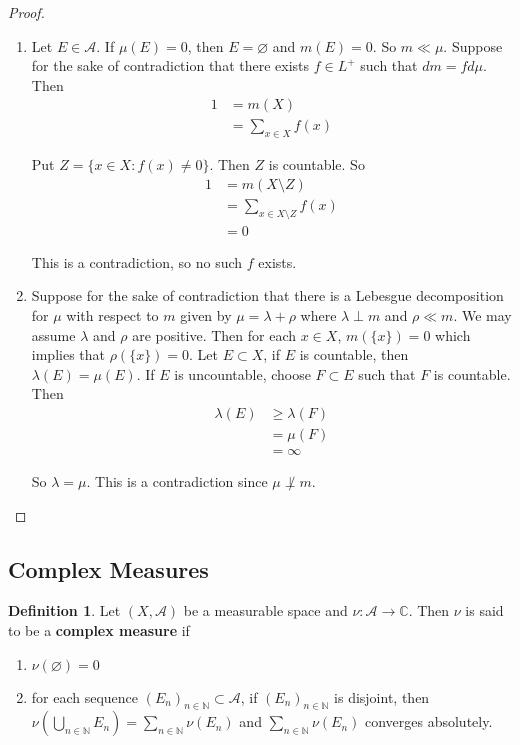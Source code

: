 \documentclass[12pt]{amsart}
\theoremstyle{definition}
\newtheorem{defn}[definition]{Definition}
\newcommand{\lam}{\lambda}
\newcommand{\C}{\mathbb{C}}
\newcommand{\N}{\mathbb{N}}
\newcommand{\MA}{\mathcal{A}}
\newcommand{\ld}[1]{\label{defn:#1}}
\begin{document}
	\begin{proof}
		\begin{enumerate}
			\item Let $E \in \MA$. If $\mu(E) = 0$, then $E = \varnothing$ and $m(E) = 0$. So $m \ll \mu$. Suppose for the sake of contradiction that there exists $f \in L^+$ such that $dm = f d\mu$. Then 
			\begin{align*}
				1
				&= m(X) \\
				&= \sum_{x \in X} f(x)
			\end{align*}
			
			Put $Z = \{x \in X: f(x) \neq 0 \}$. Then $Z$ is countable. So 
			\begin{align*}
				1
				&= m(X \setminus Z) \\
				&= \sum_{x \in X \setminus Z} f(x)\\
				&= 0
			\end{align*}
			
			This is a contradiction, so no such $f$ exists.
			
			\item Suppose for the sake of contradiction that there is a Lebesgue decomposition for $\mu$ with respect to $m$ given by $\mu = \lam + \rho$ where $\lam \perp m$ and $\rho \ll m$. We may assume $\lam$ and $\rho$ are positive. Then for each $x \in X$, $m(\{x\})=0$ which implies that $\rho(\{x\}) = 0$. Let $E \subset X$, if $E$ is countable, then $\lam(E) = \mu(E)$. If $E$ is uncountable, choose $F \subset E$ such that $F$ is countable. Then 
			\begin{align*}
				\lam(E) 
				& \geq \lam(F) \\
				& = \mu(F) \\
				&= \infty
			\end{align*}
			
			So $\lam = \mu$. This is a contradiction since $\mu \not \perp m$.
		\end{enumerate}
	\end{proof}
	
	
	
	
	
	
	
	
	
	
	
	
	\newpage	
	\subsection{Complex Measures}
	
	\begin{defn} \ld{00000} 
		Let $(X, \MA)$ be a measurable space and $\nu:\MA \rightarrow \C$. Then $\nu$ is said to be a \textbf{complex measure} if 
		\begin{enumerate}
			\item $\nu (\varnothing) = 0$
			\item for each sequence $(E_n)_{n \in \N} \subset \MA$, if $(E_n)_{n \in \N}$ is disjoint, then $\nu(\bigcup_{n \in \N} E_n) = \sum_{n \in \N} \nu(E_n)$ and $\sum_{n \in \N} \nu(E_n)$ converges absolutely. 
		\end{enumerate}
	\end{defn}
	
\end{document}
